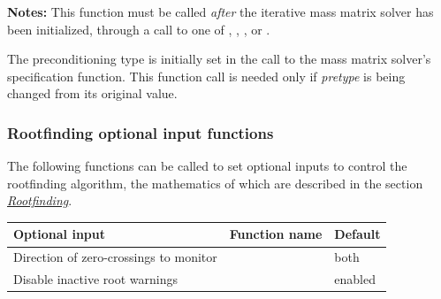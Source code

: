 \documentclass[letterpaper,10pt,english]{sphinxmanual}
\begin{document}
\begin{fulllineitems}
\textbf{Notes:} This function must be called \emph{after} the iterative mass
matrix solver has been initialized, through a call to one of
{\hyperref[c_interface/User_callable:ARKMassSpgmr]{}}, {\hyperref[c_interface/User_callable:ARKMassSpbcg]{}},
{\hyperref[c_interface/User_callable:ARKMassSptfqmr]{}}, {\hyperref[c_interface/User_callable:ARKMassSpfgmr]{}} or
{\hyperref[c_interface/User_callable:ARKMassPcg]{}}.

The preconditioning type is initially set in the call to
the mass matrix solver's specification function.  This function
call is needed only if \emph{pretype} is being changed from its original
value.

\end{fulllineitems}



\subsubsection{Rootfinding optional input functions}
\label{c_interface/User_callable:rootfinding-optional-input-functions}
The following functions can be called to set optional inputs to
control the rootfinding algorithm, the mathematics of which are
described in the section {\hyperref[Mathematics:mathematics-rootfinding]{\emph{Rootfinding}}}.

\begin{tabulary}{\linewidth}{|L|L|L|}
\hline
\textbf{
Optional input
} & \textbf{
Function name
} & \textbf{
Default
}\\\hline

Direction of zero-crossings to monitor
 & 
{\hyperref[c_interface/User_callable:ARKodeSetRootDirection]{}}
 & 
both
\\\hline

Disable inactive root warnings
 & 
{\hyperref[c_interface/User_callable:ARKodeSetNoInactiveRootWarn]{}}
 & 
enabled
\\\hline
\end{tabulary}

\end{document}
